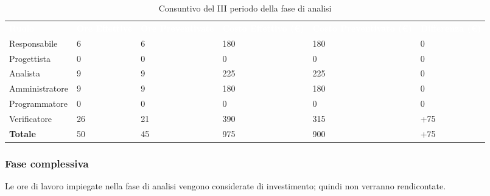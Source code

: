 \begin{table}[H]
\begin{center}
\renewcommand{\arraystretch}{1.5}
\begin{tabular}{ m{}<{\centering}  m{}<{\centering} m{}<{\centering} m{}<{\centering} m{}<{\centering} m{}<{\centering}}
	\rowcolor{darkblue}
	\textcolor{white}{\textbf{Ruolo}} & \textcolor{white}{\textbf{Ore Effettive}} & \textcolor{white}{\textbf{Ore Preventivate}}&\textcolor{white}{\textbf{Costo Effettivo (\euro) }}&\textcolor{white}{\textbf{Costo Preventivato (\euro)}}&\textcolor{white}{\textbf{Differenza (\euro)}}\\ 

	Responsabile  & 6 & 6 & 180 & 180 & 0\\	
	
	Progettista & 0 & 0 & 0 & 0 & 0\\
	
	Analista & 9 & 9 & 225 & 225 & 0\\
	
	Amministratore & 9 & 9 & 180 & 180 & 0\\
	
	Programmatore & 0 & 0 &0 &0 & 0\\
	
	Verificatore & 26 & 21 & 390 & 315 & +75\\
	
	\textbf{Totale} & 50 & 45 & 975 & 900 & +75\\
	
\end{tabular}
\caption{Consuntivo del III periodo della fase di analisi}
\end{center}
\end{table}

\subsubsection{Fase complessiva}
Le ore di lavoro impiegate nella fase di analisi vengono considerate di investimento; quindi non verranno rendicontate.

